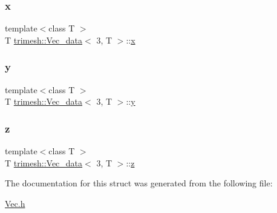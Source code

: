 \mbox{\label{structtrimesh_1_1Vec__data_3_013_00_01T_01_4_a690019913a5e76f38f3f52a9b1e664b0}} 
\subsubsection{\texorpdfstring{x}{x}}
{\footnotesize\ttfamily template$<$class T $>$ \\
T \hyperlink{structtrimesh_1_1Vec__data}{trimesh\+::\+Vec\+\_\+data}$<$ 3, T $>$\+::\hyperlink{namespacetrimesh_a3365d1b1a1bc5d8e9c844cf589a8c4a8}{x}}

\mbox{\label{structtrimesh_1_1Vec__data_3_013_00_01T_01_4_acdfbcb7be40b11f06c9d507ecfda381c}} 
\subsubsection{\texorpdfstring{y}{y}}
{\footnotesize\ttfamily template$<$class T $>$ \\
T \hyperlink{structtrimesh_1_1Vec__data}{trimesh\+::\+Vec\+\_\+data}$<$ 3, T $>$\+::\hyperlink{namespacetrimesh_a56b35d0eb7039be92fcc4867080c7419}{y}}

\mbox{\label{structtrimesh_1_1Vec__data_3_013_00_01T_01_4_a1ebe21e7854eb7118560b3558839c55b}} 
\subsubsection{\texorpdfstring{z}{z}}
{\footnotesize\ttfamily template$<$class T $>$ \\
T \hyperlink{structtrimesh_1_1Vec__data}{trimesh\+::\+Vec\+\_\+data}$<$ 3, T $>$\+::\hyperlink{namespacetrimesh_a42d0d86cc8db1d2be48121fe5e52fc67}{z}}



The documentation for this struct was generated from the following file\+:\begin{DoxyCompactItemize}
\item 
\hyperlink{Vec_8h}{Vec.\+h}\end{DoxyCompactItemize}
